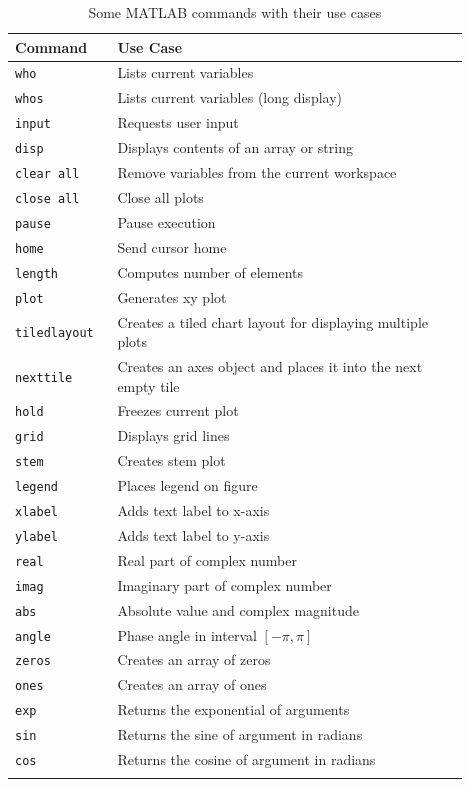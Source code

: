 \documentclass{lab_sheet}
\begin{document}
\begin{longtable}[H]
    {|m{0.2\linewidth}|m{0.7\linewidth}|}
        \hline
        \textbf{Command}&\textbf{Use Case}\\
        \hline\hline
        \texttt{who}&Lists current variables\\
        \hline
        \texttt{whos}&Lists current variables (long display)\\
        \hline
        \texttt{input}&Requests user input\\
        \hline
        \texttt{disp}&Displays contents of an array or string\\
        \hline
        \texttt{clear all}&Remove variables from the current workspace\\
        \hline
        \texttt{close all}&Close all plots\\
        \hline
        \texttt{pause}&Pause execution\\
        \hline
        \texttt{home}&Send cursor home\\
        \hline
        \texttt{length}&Computes number of elements\\
        \hline
        \texttt{plot}&Generates xy plot\\
        \hline
        \texttt{tiledlayout}&Creates a tiled chart layout for displaying multiple plots\\
        \hline
        \texttt{nexttile}&Creates an axes object and places it into the next empty tile\\
        \hline
        \texttt{hold}&Freezes current plot\\
        \hline
        \texttt{grid}&Displays grid lines\\
        \hline
        \texttt{stem}&Creates stem plot\\
        \hline
        \texttt{legend}&Places legend on figure\\
        \hline
        \texttt{xlabel}&Adds text label to x-axis\\
        \hline
        \texttt{ylabel}&Adds text label to y-axis\\
        \hline
        \texttt{real}&Real part of complex number\\
        \hline
        \texttt{imag}&Imaginary part of complex number\\
        \hline
        \texttt{abs}&Absolute value and
        complex magnitude\\
        \hline
        \texttt{angle}&Phase angle in interval $[-\pi,\pi]$\\
        \hline
        \texttt{zeros}&Creates an array of zeros\\
        \hline
        \texttt{ones}&Creates an array of ones\\
        \hline
        \texttt{exp}&Returns the exponential of arguments\\
        \hline
        \texttt{sin}&Returns the sine of argument in
        radians\\
        \hline
        \texttt{cos}&Returns the cosine of argument in
        radians\\
       \hline
       \caption{Some MATLAB commands with their use cases}
\end{longtable}
\end{document}
